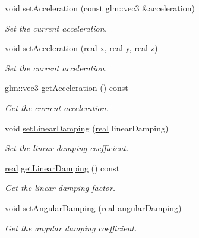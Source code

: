 \begin{DoxyCompactItemize}
void \mbox{\hyperlink{classr3_1_1_rigid_body_add57880a9a4df0d016c1639eba48350d}{set\+Acceleration}} (const glm\+::vec3 \&acceleration)
\begin{DoxyCompactList}\small\item\em Set the current acceleration. \end{DoxyCompactList}\item 
void \mbox{\hyperlink{classr3_1_1_rigid_body_a39362e0dad1d6758be86c54fc6e6b944}{set\+Acceleration}} (\mbox{\hyperlink{namespacer3_ab2016b3e3f743fb735afce242f0dc1eb}{real}} x, \mbox{\hyperlink{namespacer3_ab2016b3e3f743fb735afce242f0dc1eb}{real}} y, \mbox{\hyperlink{namespacer3_ab2016b3e3f743fb735afce242f0dc1eb}{real}} z)
\begin{DoxyCompactList}\small\item\em Set the current acceleration. \end{DoxyCompactList}\item 
glm\+::vec3 \mbox{\hyperlink{classr3_1_1_rigid_body_aa763cbd71d2ba60cc45540854d3ecf9b}{get\+Acceleration}} () const
\begin{DoxyCompactList}\small\item\em Get the current acceleration. \end{DoxyCompactList}\item 
void \mbox{\hyperlink{classr3_1_1_rigid_body_ac65bfd9fd7a12de59141fab3c02e8579}{set\+Linear\+Damping}} (\mbox{\hyperlink{namespacer3_ab2016b3e3f743fb735afce242f0dc1eb}{real}} linear\+Damping)
\begin{DoxyCompactList}\small\item\em Set the linear damping coefficient. \end{DoxyCompactList}\item 
\mbox{\hyperlink{namespacer3_ab2016b3e3f743fb735afce242f0dc1eb}{real}} \mbox{\hyperlink{classr3_1_1_rigid_body_ab48c055a703f1d3d84b9f1977ef504e6}{get\+Linear\+Damping}} () const
\begin{DoxyCompactList}\small\item\em Get the linear damping factor. \end{DoxyCompactList}\item 
void \mbox{\hyperlink{classr3_1_1_rigid_body_a53d9954e15f52459386ea82e299c9857}{set\+Angular\+Damping}} (\mbox{\hyperlink{namespacer3_ab2016b3e3f743fb735afce242f0dc1eb}{real}} angular\+Damping)
\begin{DoxyCompactList}\small\item\em Get the angular damping coefficient. \end{DoxyCompactList}\item 

\end{DoxyCompactItemize}
